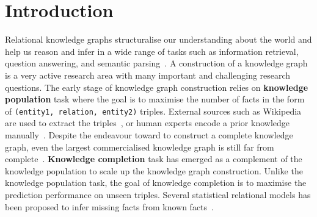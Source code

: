 
\section{Introduction}
\label{sec:intro}

Relational knowledge graphs structuralise our understanding about the world
and help us reason and infer in a wide range of tasks such as information retrieval, question answering, and semantic parsing~\cite{Dong2015,jiang2015improving,kim2013context,sondhi2014mining}.
A construction of a knowledge graph is a very active research area with many important and challenging research questions.
The early stage of knowledge graph construction relies on {\bf knowledge population} task
where the goal is to maximise the number of facts in the form of \texttt{(entity1, relation, entity2)} triples.
External sources such as Wikipedia are used to extract the triples~\cite{hoffart2013yago2},
or human experts encode a prior knowledge manually~\cite{bollacker2008freebase}.
Despite the endeavour toward to construct a complete knowledge graph, 
even the largest commercialised knowledge graph is still far from complete~\cite{dong2014knowledge}. 
{\bf Knowledge completion} task has emerged as a complement of the knowledge population 
to scale up the knowledge graph construction. 
Unlike the knowledge population task, the goal of knowledge completion is to maximise the prediction performance on unseen triples. Several statistical relational models has been proposed to infer missing facts from known facts~\cite{Lao2010,nickel2011three}.

